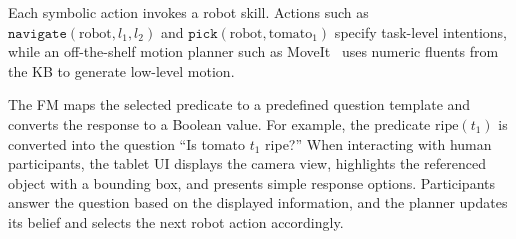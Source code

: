 
\label{method:action_execution}
Each symbolic action invokes a robot skill. Actions such as $\texttt{navigate}(\text{robot},l_1,l_2)$ and $\texttt{pick}(\text{robot},\text{tomato}_1)$ specify task-level intentions, while an off-the-shelf motion planner such as MoveIt~\citep{chitta2012moveit} uses numeric fluents from the KB to generate low-level motion.

\label{method:FM}
The FM maps the selected predicate to a predefined question template and converts the response to a Boolean value. For example, the predicate $\mathrm{ripe}(t_1)$ is converted into the question ``Is tomato $t_1$ ripe?'' When interacting with human participants, the tablet UI displays the camera view, highlights the referenced object with a bounding box, and presents simple response options. Participants answer the question based on the displayed information, and the planner updates its belief and selects the next robot action accordingly.